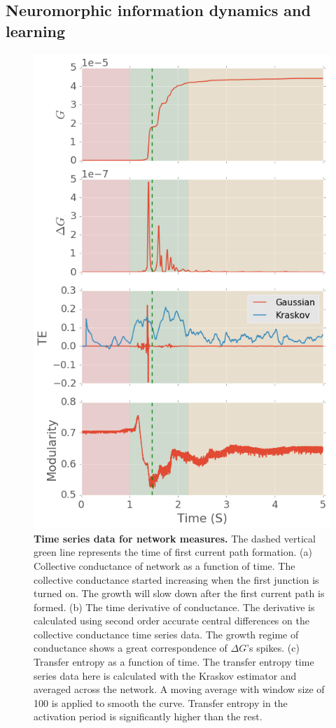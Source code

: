\documentclass[fleqn,10pt,  reprint, amsmath,amssymb,aps, floatfix]{wlscirep}
\begin{document}




\subsection*{Neuromorphic information dynamics and learning}

\begin{figure}
	\centering
	\includegraphics[width=0.5\linewidth]{figure/time_series}
	\caption{\textbf{Time series data for network measures.} The dashed vertical green line represents the 			time of first current path formation.
			\newline (a) Collective conductance of network as a function of time. The collective conductance started increasing when the first junction is turned on. The growth will slow down after the first current path is formed.
			\newline (b) The time derivative of conductance. The derivative is calculated using second order accurate central differences on the collective conductance time series data. The growth regime of conductance shows a great correspondence of $\Delta G$'s spikes.
			\newline (c) Transfer entropy as a function of time. The transfer entropy time series data here is calculated with the Kraskov estimator and averaged across the network. A moving average with window size of 100 is applied to smooth the curve. Transfer entropy in the activation period is significantly higher than the rest.
}
\end{figure}
\end{document}
